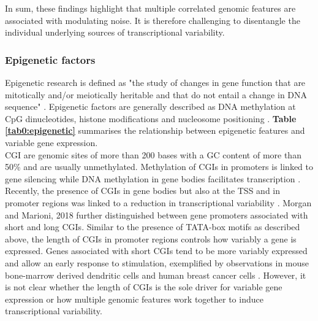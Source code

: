 In sum, these findings highlight that multiple correlated genomic features are associated with modulating noise. 
It is therefore challenging to disentangle the individual underlying sources of transcriptional variability. 

\subsubsection{Epigenetic factors}
\label{sec0:epigenetic}

Epigenetic research is defined as "the study of changes in gene function that are mitotically and/or meiotically heritable and that do not entail a change in DNA sequence" \citep{Wu2001}. 
Epigenetic factors are generally described as DNA methylation at \gls{CpG} dinucleotides, histone modifications and nucleosome positioning  \citep{Portela2010}. 
\textbf{Table \ref{tab0:epigenetic}} summarises the relationship between epigenetic features and variable gene expression. \\

\Gls{CGI} are genomic sites of more than 200 bases with a GC content of more than 50\% and are usually unmethylated. 
Methylation of CGIs in promoters is linked to gene silencing while DNA methylation in gene bodies facilitates transcription \citep{Portela2010}.  
Recently, the presence of CGIs in gene bodies but also at the TSS and in promoter regions was linked to a reduction in transcriptional variability \citep{Faure2017}. 
Morgan and Marioni, 2018 further distinguished between gene promoters associated with short and long CGIs.  
Similar to the presence of TATA-box motifs as described above, the length of CGIs in promoter regions controls how variably a gene is expressed. 
Genes associated with short CGIs tend to be more variably expressed and allow an early response to stimulation, exemplified by observations in mouse bone-marrow derived dendritic cells and human breast cancer cells \citep{Morgan2018}.
However, it is not clear whether the length of CGIs is the sole driver for variable gene expression or how multiple genomic features work together to induce transcriptional variability. \\

